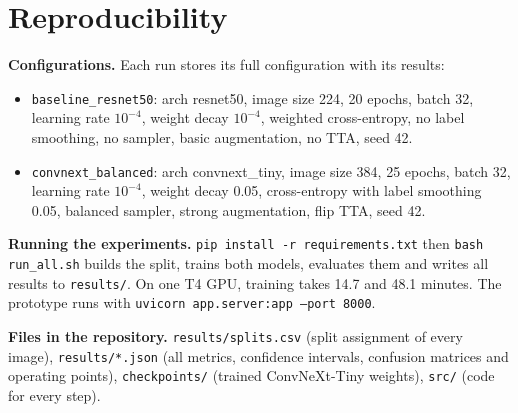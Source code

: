 \documentclass[11pt,a4paper]{article}
\begin{document}
\section*{Reproducibility}
\sloppy
\textbf{Configurations.} Each run stores its full configuration with its results:
\begin{itemize}
  \item \texttt{baseline\_resnet50}: arch resnet50, image size 224, 20 epochs, batch 32, learning rate $10^{-4}$, weight decay $10^{-4}$, weighted cross-entropy, no label smoothing, no sampler, basic augmentation, no TTA, seed 42.
  \item \texttt{convnext\_balanced}: arch convnext\_tiny, image size 384, 25 epochs, batch 32, learning rate $10^{-4}$, weight decay 0.05, cross-entropy with label smoothing 0.05, balanced sampler, strong augmentation, flip TTA, seed 42.
\end{itemize}
\textbf{Running the experiments.} \texttt{pip install -r requirements.txt} then \texttt{bash run\_all.sh} builds the split, trains both models, evaluates them and writes all results to \texttt{results/}. On one T4 GPU, training takes 14.7 and 48.1 minutes. The prototype runs with \texttt{uvicorn app.server:app --port 8000}.

\textbf{Files in the repository.} \texttt{results/splits.csv} (split assignment of every image), \texttt{results/*.json} (all metrics, confidence intervals, confusion matrices and operating points), \texttt{checkpoints/} (trained ConvNeXt-Tiny weights), \texttt{src/} (code for every step).
\end{document}
